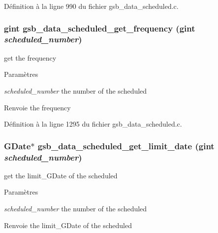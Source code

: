 Définition à la ligne 990 du fichier gsb\_\-data\_\-scheduled.c.

\subsubsection[{gsb\_\-data\_\-scheduled\_\-get\_\-frequency}]{\setlength{\rightskip}{0pt plus 5cm}gint gsb\_\-data\_\-scheduled\_\-get\_\-frequency (gint {\em scheduled\_\-number})}\label{gsb__data__scheduled_8h_a60ab7adb921a63a38d8bcaec72d4165d}
get the frequency


\begin{DoxyParams}{Paramètres}
\item[{\em scheduled\_\-number}]the number of the scheduled\end{DoxyParams}
\begin{DoxyReturn}{Renvoie}
the frequency 
\end{DoxyReturn}


Définition à la ligne 1295 du fichier gsb\_\-data\_\-scheduled.c.

\subsubsection[{gsb\_\-data\_\-scheduled\_\-get\_\-limit\_\-date}]{\setlength{\rightskip}{0pt plus 5cm}GDate$\ast$ gsb\_\-data\_\-scheduled\_\-get\_\-limit\_\-date (gint {\em scheduled\_\-number})}\label{gsb__data__scheduled_8h_a7817b56aaa3000e66de01e0d436f267f}
get the limit\_\-GDate of the scheduled


\begin{DoxyParams}{Paramètres}
\item[{\em scheduled\_\-number}]the number of the scheduled\end{DoxyParams}
\begin{DoxyReturn}{Renvoie}
the limit\_\-GDate of the scheduled 
\end{DoxyReturn}


